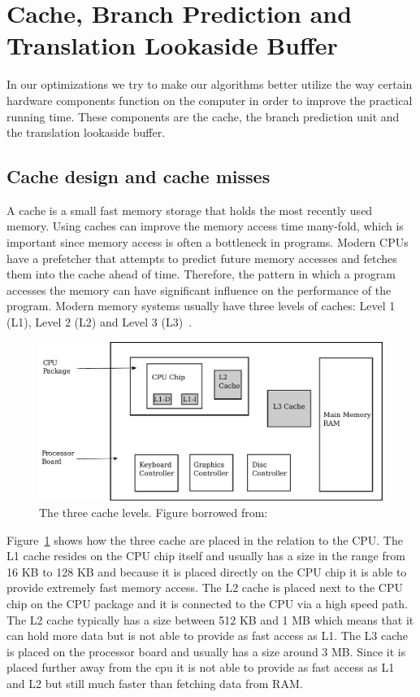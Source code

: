 \section{Cache, Branch Prediction and Translation Lookaside Buffer}
In our optimizations we try to make our algorithms better utilize the way certain hardware components function on the computer in order to improve the practical running time. 
These components are the cache, the branch prediction unit and the translation lookaside buffer.

\subsection{Cache design and cache misses}
A cache is a small fast memory storage that holds the most recently used memory.
Using caches can improve the memory access time many-fold, which is important since memory access is often a bottleneck in programs.
Modern CPUs have a prefetcher that attempts to predict future memory accesses and fetches them into the cache ahead of time.
Therefore, the pattern in which a program accesses the memory can have significant influence on the performance of the program.
Modern memory systems usually have three levels of caches: Level 1 (L1), Level 2 (L2) and Level 3 (L3)~.

\begin{figure}
\includegraphics[width=\textwidth]{CacheLevels.pdf}
\caption{The three cache levels. Figure borrowed from:~\citep[Section~4.5.1]{Tanenbaum}}
\label{fig:CacheLevels}
\end{figure}

Figure~\ref{fig:CacheLevels} shows how the three cache are placed in the relation to the CPU. 
The L1 cache resides on the CPU chip itself and usually has a size in the range from 16 KB to 128 KB and because it is placed directly on the CPU chip it is able to provide extremely fast memory access.
The L2 cache is placed next to the CPU chip on the CPU package and it is connected to the CPU via a high speed path. The L2 cache typically has a size between 512 KB and 1 MB which means that it can hold more data but is not able to provide as fast access as L1.
The L3 cache is placed on the processor board and usually has a size around 3 MB. 
Since it is placed further away from the cpu it is not able to provide as fast access as L1 and L2 but still much faster than fetching data from RAM.

